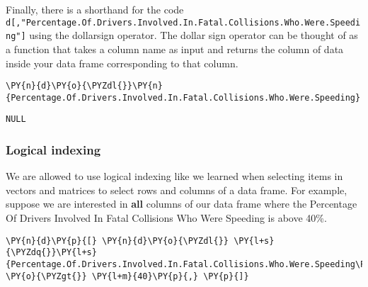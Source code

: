     
    Finally, there is a shorthand for the code
\texttt{d{[},"Percentage.Of.Drivers.Involved.In.Fatal.Collisions.Who.Were.Speeding"{]}}
using the dollarsign operator. The dollar sign operator can be thought
of as a function that takes a column name as input and returns the
column of data inside your data frame corresponding to that column.

    \begin{tcolorbox}[breakable, size=fbox, boxrule=1pt, pad at break*=1mm,colback=cellbackground, colframe=cellborder]
\begin{Verbatim}[commandchars=\\\{\}]
\PY{n}{d}\PY{o}{\PYZdl{}}\PY{n}{Percentage.Of.Drivers.Involved.In.Fatal.Collisions.Who.Were.Speeding}
\end{Verbatim}
\end{tcolorbox}

    
    \begin{Verbatim}[commandchars=\\\{\}]
NULL
    \end{Verbatim}

    
    \hypertarget{logical-indexing}{%
\subsubsection{Logical indexing}\label{logical-indexing}}

We are allowed to use logical indexing like we learned when selecting
items in vectors and matrices to select rows and columns of a data
frame. For example, suppose we are interested in \textbf{all} columns of
our data frame where the Percentage Of Drivers Involved In Fatal
Collisions Who Were Speeding is above 40\%.

    \begin{tcolorbox}[breakable, size=fbox, boxrule=1pt, pad at break*=1mm,colback=cellbackground, colframe=cellborder]
\begin{Verbatim}[commandchars=\\\{\}]
\PY{n}{d}\PY{p}{[} \PY{n}{d}\PY{o}{\PYZdl{}} \PY{l+s}{\PYZdq{}}\PY{l+s}{Percentage.Of.Drivers.Involved.In.Fatal.Collisions.Who.Were.Speeding\PYZdq{}} \PY{o}{\PYZgt{}} \PY{l+m}{40}\PY{p}{,} \PY{p}{]}
\end{Verbatim}
\end{tcolorbox}

